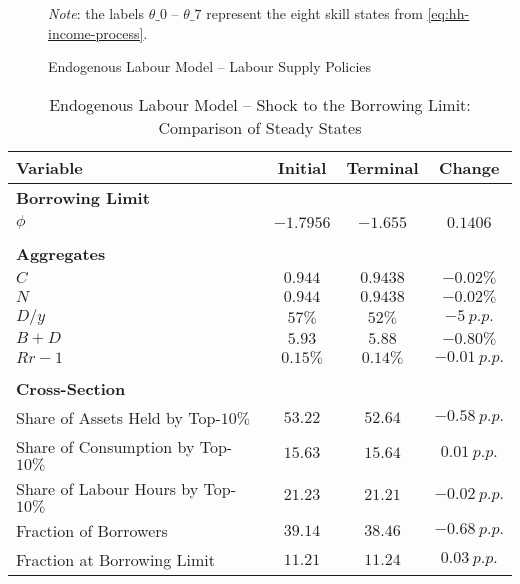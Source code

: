 \documentclass[a4paper,12pt]{article} %
\numberwithin{equation}{section} %
\numberwithin{figure}{section}
\numberwithin{table}{section}
\begin{document}
\begin{refsection}
\begin{appendices}
\begin{figure}[H]
    \centering
    \caption{Endogenous Labour Model -- Labour Supply Policies}
    \label{fig:init-stst-end-L-pol-n}
    

    \vspace{10pt}
    
    \begin{minipage}{0.75\textwidth}
    \footnotesize
    \textit{Note}: the labels $\theta\_0$ -- $\theta\_7$ represent the eight skill states from \eqref{eq:hh-income-process}.
    \end{minipage}
\end{figure}

\begin{table}[H]
\centering
\caption{Endogenous Labour Model -- Shock to the Borrowing Limit: \\ Comparison of Steady States}
\label{tab:stst_comparison_end_L_limit_permanent}
\begin{tabular}{lccc}
Variable & Initial & Terminal &  Change \\
\hline
\hline
\multicolumn{2}{l}{\textbf{Borrowing Limit}} & & \\
$\phi$ & $-1.7956$ &   $-1.655$ &  $0.1406$ \\
& & & \\
\multicolumn{2}{l}{\textbf{Aggregates}} & & \\
$C$ &   $0.944$ &   $0.9438$ & $-0.02\%$ \\
$N$ &   $0.944$ &   $0.9438$ & $-0.02\%$ \\
$D / y$ & $57\%$ & $52\%$ & $-5 \ p.p.$ \\
$B+D$ &  $5.93$ &   $5.88$ & $-0.80\%$ \\
$Rr-1$ &  $0.15\%$ & $0.14\%$ & $-0.01 \ p.p.$ \\
& & & \\
\multicolumn{2}{l}{\textbf{Cross-Section}} & & \\
Share of Assets Held by Top-$10\%$ &  $53.22$ &   $52.64$ & $-0.58 \ p.p.$ \\
Share of Consumption by Top-$10\%$ &  $15.63$ &   $15.64$ &  $0.01 \ p.p.$ \\
Share of Labour Hours by Top-$10\%$ &  $21.23$ &   $21.21$ & $-0.02 \ p.p.$ \\
Fraction of Borrowers &   $39.14$ &    $38.46$ & $-0.68 \ p.p.$ \\
Fraction at Borrowing Limit &   $11.21$ &    $11.24$ &  $0.03 \ p.p.$ \\

\end{tabular}
\end{table}
\end{appendices}
\end{refsection}
\end{document}

